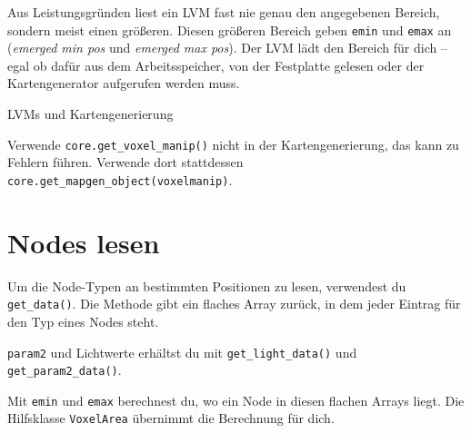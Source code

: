 Aus Leistungsgründen liest ein LVM fast nie genau den angegebenen
Bereich, sondern meist einen größeren. Diesen größeren Bereich geben
\texttt{emin} und \texttt{emax} an (\emph{emerged min pos} und
\emph{emerged max pos}). Der LVM lädt den Bereich für dich -- egal ob
dafür aus dem Arbeitsspeicher, von der Festplatte gelesen oder der
Kartengenerator aufgerufen
werden muss.

\begin{hinweis}{LVMs und Kartengenerierung}

Verwende
\texttt{core.\allowbreak{}get\_\allowbreak{}voxel\_\allowbreak{}manip()}
nicht in der Kartengenerierung, das kann zu Fehlern führen. Verwende
dort stattdessen
\texttt{core.\allowbreak{}get\_\allowbreak{}mapgen\_\allowbreak{}object(\textquotedbl{}voxelmanip\textquotedbl{})}.

\end{hinweis}

\section{Nodes lesen}\label{nodes-lesen}

Um die Node-Typen an bestimmten Positionen zu lesen, verwendest du
\texttt{get\_\allowbreak{}data()}. Die Methode gibt ein flaches Array
zurück, in dem jeder Eintrag für den Typ eines Nodes steht.

\begin{Shaded}
\begin{Highlighting}[]
  \OperatorTok{=} \OperatorTok{:}\OperatorTok{()}
\end{Highlighting}
\end{Shaded}

\texttt{param2} und Lichtwerte erhältst du mit
\texttt{get\_\allowbreak{}light\_\allowbreak{}data()} und
\texttt{get\_\allowbreak{}param2\_\allowbreak{}data()}.

Mit \texttt{emin} und \texttt{emax} berechnest du, wo ein Node in diesen
flachen Arrays liegt. Die Hilfsklasse
\texttt{VoxelArea} übernimmt die
Berechnung für dich.


